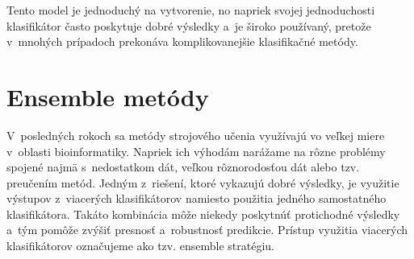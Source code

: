 Tento model je jednoduchý na vytvorenie, no napriek svojej jednoduchosti klasifikátor často poskytuje dobré výsledky a~je široko používaný, pretože v~mnohých prípadoch prekonáva komplikovanejšie klasifikačné metódy.

\chapter{Ensemble metódy}

V~posledných rokoch sa metódy strojového učenia využívajú vo veľkej miere v~oblasti bioinformatiky. Napriek ich výhodám narážame na rôzne problémy spojené najmä s~nedostatkom dát, veľkou rôznorodosťou dát alebo tzv. preučením metód. Jedným z~riešení, ktoré vykazujú dobré výsledky, je využitie výstupov z~viacerých klasifikátorov namiesto použitia jedného samostatného klasifikátora. Takáto kombinácia môže niekedy poskytnúť protichodné výsledky a~tým pomôže zvýšiť presnosť a~robustnosť predikcie. Prístup využitia viacerých klasifikátorov označujeme ako tzv. ensemble stratégiu.

